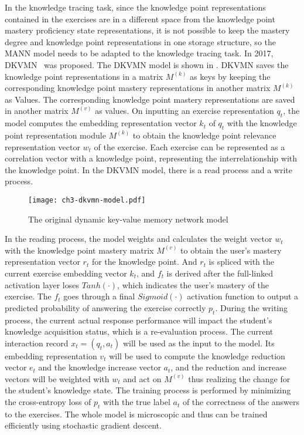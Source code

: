 In the knowledge tracing task, since the knowledge point representations contained in the exercises are in a different space from the knowledge point mastery proficiency state representations, it is not possible to keep the mastery degree and knowledge point representations in one storage structure, so the MANN model needs to be adapted to the knowledge tracing task. In 2017, DKVMN~\cite{zhang2017dynamic} was proposed. The DKVMN model is shown in \figname{\ref{fig:ch3-dkvmn-model}}. DKVMN saves the knowledge point representations in a matrix \(M^{(k)}\) as keys by keeping the corresponding knowledge point mastery representations in another matrix \(M^{(k)}\) as Values. The corresponding knowledge point mastery representations are saved in another matrix \(M^{(v)}\) as values. On inputting an exercise representation \(q_t\), the model computes the embedding representation vector \(k_t\) of \(q_t\) with the knowledge point representation module \(M^{(k)}\) to obtain the knowledge point relevance representation vector \(w_t\) of the exercise. Each exercise can be represented as a correlation vector with a knowledge point, representing the interrelationship with the knowledge point. In the DKVMN model, there is a read process and a write process.

\begin{figure}[htbp!]
    \centering
    \texttt{[image: ch3-dkvmn-model.pdf]}
    \caption{The original dynamic key-value memory network model}\label{fig:ch3-dkvmn-model}
\end{figure}

In the reading process, the model weights and calculates the weight vector \(w_t\) with the knowledge point mastery matrix \(M^{(v)}\) to obtain the user's mastery representation vector \(r_t\) for the knowledge point. And \(r_t\) is spliced with the current exercise embedding vector \(k_t\), and \(f_t\) is derived after the full-linked activation layer loses \(Tanh(\cdot)\), which indicates the user's mastery of the exercise. The \(f_t\) goes through a final \(Sigmoid(\cdot)\) activation function to output a predicted probability of answering the exercise correctly \(p_t\). During the writing process, the current actual response performance will impact the student's knowledge acquisition status, which is a re-evaluation process. The current interaction record \(x_t=(q_t,a_t)\) will be used as the input to the model. Its embedding representation \(v_t\) will be used to compute the knowledge reduction vector \(e_t\) and the knowledge increase vector \(a_t\), and the reduction and increase vectors will be weighted with \(w_t\) and act on \(M^{(v)}\) thus realizing the change for the student's knowledge state. The training process is performed by minimizing the cross-entropy loss of \(p_t\) with the true label \(a_t\) of the correctness of the answers to the exercises. The whole model is microscopic and thus can be trained efficiently using stochastic gradient descent.

